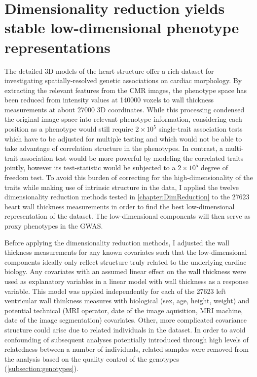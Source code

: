 \newpage
\section{Dimensionality reduction yields stable low-dimensional phenotype representations}
\label{section:DimRed-heart}
The detailed 3D models of the heart structure offer a rich dataset for investigating spatially-resolved genetic associations on cardiac morphology. By extracting the relevant features from the CMR images, the phenotype space has been reduced from intensity values at \num{140000} voxels to wall thickness measurements at about \num{27000} 3D coordinates. While this processing condensed the original image space into relevant phenotype information, considering each position as a phenotype would still require \(2\times 10^5\)  single-trait association tests which have to be adjusted for multiple testing and which would not be able to take advantage of correlation structure in the phenotypes. In contrast, a multi-trait association test would be more powerful by modeling the correlated traits jointly, however its test-statistic would be subjected to a \(2 \times 10^5\)  degree of freedom test. To avoid this burden of correcting for the high-dimensionality of the traits while making use of intrinsic structure in the data, I applied the twelve dimensionality reduction methods tested in \cref{chapter:DimReduction} to the \num{27623} heart wall thickness measurements in order to find the best low-dimensional representation of the dataset. The low-dimensional components will then serve as proxy phenotypes in the GWAS.

Before applying the dimensionality reduction methods, I adjusted the wall thickness measurements for any known covariates such that the low-dimensional components ideally only reflect structure truly related to the underlying cardiac biology. Any covariates with an assumed linear effect on the wall thickness were used as explanatory variables in a linear model with wall thickness as a response variable. This model was applied independently for each of the \num{27623} left ventricular wall thinkness measures with biological (sex, age, height, weight) and potential technical (MRI operator, date of the image aquisition, MRI machine, date of the image segmentation) covariates. Other, more complicated covariance structure could arise due to related individuals in the dataset. In order to avoid confounding of subsequent analyses potentially introduced through high levels of relatedness between a number of individuals, related samples were removed from the analysis based on the quality control of the genotypes (\cref{subsection:genotypes}). 

